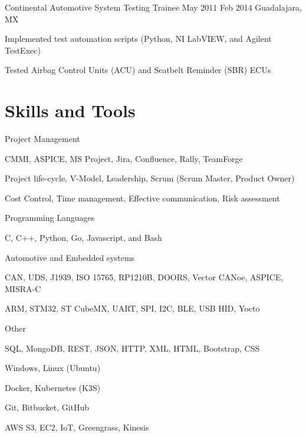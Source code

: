 \documentclass{resume} %
\begin{document}
\job
    {Continental Automotive}
    {System Testing Trainee}
    {May 2011}
    {Feb 2014}
    {Guadalajara, MX}
    {
    \begin{itemize-bullets}
    \item{Implemented test automation scripts (Python, NI LabVIEW, and Agilent TestExec)}
    \item{Tested Airbag Control Units (ACU) and Seatbelt Reminder (SBR) ECUs}
    \end{itemize-bullets}
    }



\section{Skills and Tools}


\skillgroup
    {Project Management}
    {
    \begin{itemize-bullets}
        \item{CMMI, ASPICE, MS Project, Jira, Confluence, Rally, TeamForge}
        \item{Project life-cycle, V-Model, Leadership, Scrum (Scrum Master, Product Owner)}
        \item{Cost Control, Time management, Effective communication, Risk assessment}
        \end{itemize-bullets}
    }


\skillgroup
    {Programming Languages}
    {
    \begin{itemize-bullets}
        \item{C, C++, Python, Go, Javascript, and Bash}
        \end{itemize-bullets}
    }


\skillgroup
    {Automotive and Embedded systems}
    {
    \begin{itemize-bullets}
        \item{CAN, UDS, J1939, ISO 15765, RP1210B, DOORS, Vector CANoe, ASPICE, MISRA-C}
        \item{ARM, STM32, ST CubeMX, UART, SPI, I2C, BLE, USB HID, Yocto}
        \end{itemize-bullets}
    }


\skillgroup
    {Other}
    {
    \begin{itemize-bullets}
        \item{SQL, MongoDB, REST, JSON, HTTP, XML, HTML, Bootstrap, CSS}
        \item{Windows, Linux (Ubuntu)}
        \item{Docker, Kubernetes (K3S)}
        \item{Git, Bitbucket, GitHub}
        \item{AWS S3, EC2, IoT, Greengrass, Kinesis}
        \end{itemize-bullets}
    }
\end{document}
